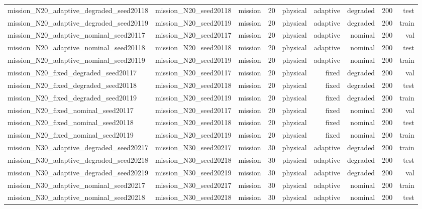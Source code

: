 \begin{tabular}{lrrrrrrrr}
mission\_N20\_adaptive\_degraded\_seed20118 & mission\_N20\_seed20118 & mission & 20 & physical & adaptive & degraded & 200 & test \\
mission\_N20\_adaptive\_degraded\_seed20119 & mission\_N20\_seed20119 & mission & 20 & physical & adaptive & degraded & 200 & train \\
mission\_N20\_adaptive\_nominal\_seed20117 & mission\_N20\_seed20117 & mission & 20 & physical & adaptive & nominal & 200 & val \\
mission\_N20\_adaptive\_nominal\_seed20118 & mission\_N20\_seed20118 & mission & 20 & physical & adaptive & nominal & 200 & test \\
mission\_N20\_adaptive\_nominal\_seed20119 & mission\_N20\_seed20119 & mission & 20 & physical & adaptive & nominal & 200 & train \\
mission\_N20\_fixed\_degraded\_seed20117 & mission\_N20\_seed20117 & mission & 20 & physical & fixed & degraded & 200 & val \\
mission\_N20\_fixed\_degraded\_seed20118 & mission\_N20\_seed20118 & mission & 20 & physical & fixed & degraded & 200 & test \\
mission\_N20\_fixed\_degraded\_seed20119 & mission\_N20\_seed20119 & mission & 20 & physical & fixed & degraded & 200 & train \\
mission\_N20\_fixed\_nominal\_seed20117 & mission\_N20\_seed20117 & mission & 20 & physical & fixed & nominal & 200 & val \\
mission\_N20\_fixed\_nominal\_seed20118 & mission\_N20\_seed20118 & mission & 20 & physical & fixed & nominal & 200 & test \\
mission\_N20\_fixed\_nominal\_seed20119 & mission\_N20\_seed20119 & mission & 20 & physical & fixed & nominal & 200 & train \\
mission\_N30\_adaptive\_degraded\_seed20217 & mission\_N30\_seed20217 & mission & 30 & physical & adaptive & degraded & 200 & train \\
mission\_N30\_adaptive\_degraded\_seed20218 & mission\_N30\_seed20218 & mission & 30 & physical & adaptive & degraded & 200 & test \\
mission\_N30\_adaptive\_degraded\_seed20219 & mission\_N30\_seed20219 & mission & 30 & physical & adaptive & degraded & 200 & val \\
mission\_N30\_adaptive\_nominal\_seed20217 & mission\_N30\_seed20217 & mission & 30 & physical & adaptive & nominal & 200 & train \\
mission\_N30\_adaptive\_nominal\_seed20218 & mission\_N30\_seed20218 & mission & 30 & physical & adaptive & nominal & 200 & test \\

\end{tabular}
